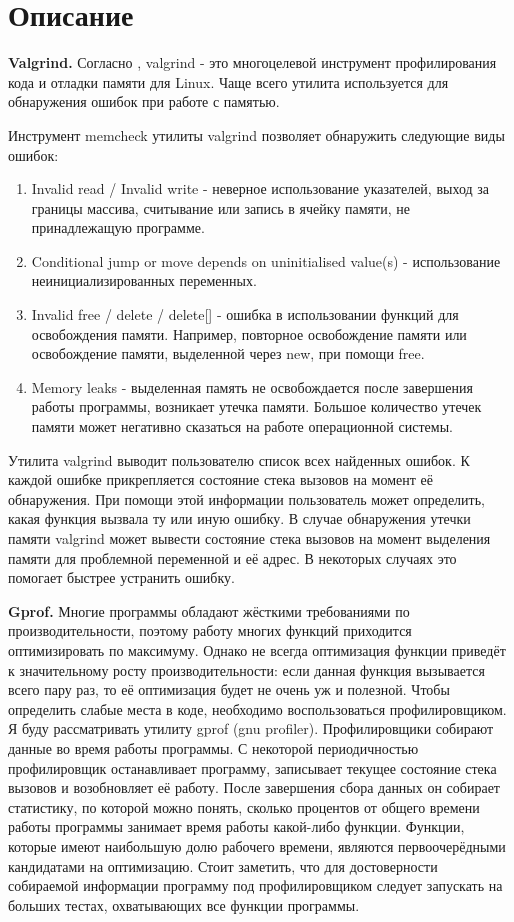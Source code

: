 \section{Описание}

\textbf{Valgrind.} Согласно \cite{Valgrind}, valgrind - это многоцелевой инструмент профилирования кода и отладки памяти 
для Linux. Чаще всего утилита используется для обнаружения ошибок при работе с памятью.

Инструмент memcheck утилиты valgrind позволяет обнаружить следующие виды ошибок:

\begin{enumerate}
	\item Invalid read / Invalid write - неверное использование указателей, выход за границы массива, считывание или запись 
	в ячейку памяти, не принадлежащую программе.
	
	\item Conditional jump or move depends on uninitialised value(s) - использование неинициализированных переменных.
	
	\item Invalid free / delete / delete[] - ошибка в использовании функций для освобождения памяти. Например, повторное 
	освобождение памяти или освобождение памяти, выделенной через new, при помощи free.
	
	\item Memory leaks - выделенная память не освобождается после завершения работы программы, возникает утечка памяти. 
	Большое количество утечек памяти может негативно сказаться на работе операционной системы.	
\end{enumerate}

Утилита valgrind выводит пользователю список всех найденных ошибок. К каждой ошибке прикрепляется состояние стека вызовов 
на момент её обнаружения. При помощи этой информации пользователь может определить, какая функция вызвала ту или иную ошибку. 
В случае обнаружения утечки памяти valgrind может вывести состояние стека вызовов на момент выделения памяти для проблемной 
переменной и её адрес. В некоторых случаях это помогает быстрее устранить ошибку.


\textbf{Gprof.}  Многие программы обладают жёсткими требованиями по производительности, поэтому работу многих функций приходится оптимизировать по максимуму. Однако не всегда оптимизация функции приведёт к значительному росту производительности: если данная 
функция вызывается всего пару раз, то её оптимизация будет не очень уж и полезной. Чтобы определить слабые места в коде, необходимо воспользоваться профилировщиком. Я буду рассматривать утилиту gprof (gnu profiler). 
Профилировщики собирают данные во время работы программы. С некоторой периодичностью профилировщик останавливает программу, 
записывает текущее состояние стека вызовов и возобновляет её работу. После завершения сбора данных он собирает статистику, 
по которой можно понять, сколько процентов от общего времени работы программы занимает время работы какой-либо функции. 
Функции, которые имеют наибольшую долю рабочего времени, являются первоочерёдными кандидатами на оптимизацию. Стоит заметить, 
что для достоверности собираемой информации программу под профилировщиком следует запускать на больших тестах, охватывающих 
все функции программы.


